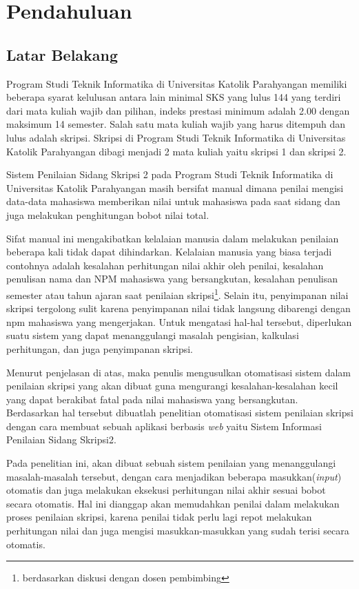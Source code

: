 \chapter{Pendahuluan}
\label{chap:pendahuluan}

\section{Latar Belakang}
\label{sec:latarBelakang}

	Program Studi Teknik Informatika di Universitas Katolik Parahyangan memiliki beberapa syarat kelulusan antara lain minimal SKS yang lulus 144 yang terdiri dari mata kuliah wajib dan pilihan, indeks prestasi minimum adalah 2.00 dengan maksimum 14 semester. Salah satu mata kuliah wajib yang harus ditempuh dan lulus adalah skripsi. Skripsi di Program Studi Teknik Informatika di Universitas Katolik Parahyangan dibagi menjadi 2 mata kuliah yaitu skripsi 1 dan skripsi 2. 
	
	Sistem Penilaian Sidang Skripsi 2 pada Program Studi Teknik Informatika di Universitas Katolik Parahyangan masih bersifat manual dimana penilai mengisi data-data mahasiswa  memberikan nilai untuk mahasiswa pada saat sidang dan juga melakukan penghitungan bobot nilai total. 
	
	Sifat manual ini mengakibatkan kelalaian manusia dalam melakukan penilaian beberapa kali tidak dapat dihindarkan. Kelalaian manusia yang biasa terjadi contohnya adalah kesalahan perhitungan nilai akhir oleh penilai, kesalahan penulisan nama dan NPM mahasiswa yang bersangkutan, kesalahan penulisan semester atau tahun ajaran saat penilaian skripsi\footnote{berdasarkan diskusi dengan dosen pembimbing}. Selain itu, penyimpanan nilai skripsi tergolong sulit karena penyimpanan nilai tidak langsung dibarengi dengan npm mahasiswa yang mengerjakan. Untuk mengatasi hal-hal tersebut, diperlukan suatu sistem yang dapat menanggulangi masalah pengisian, kalkulasi perhitungan, dan juga penyimpanan skripsi.
	
	Menurut penjelasan di atas, maka penulis mengusulkan otomatisasi sistem dalam penilaian skripsi yang akan dibuat guna mengurangi kesalahan-kesalahan kecil yang dapat berakibat fatal pada nilai mahasiswa yang bersangkutan. Berdasarkan hal tersebut dibuatlah penelitian otomatisasi sistem penilaian skripsi dengan cara membuat sebuah aplikasi berbasis \textit{web} yaitu Sistem Informasi Penilaian Sidang Skripsi2.
		
	Pada penelitian ini, akan dibuat sebuah sistem penilaian yang menanggulangi masalah-masalah tersebut, dengan cara menjadikan beberapa masukkan(\textit{input}) otomatis dan juga melakukan eksekusi perhitungan nilai akhir sesuai bobot secara otomatis. Hal ini dianggap akan memudahkan penilai dalam melakukan proses penilaian skripsi, karena penilai tidak perlu lagi repot melakukan perhitungan nilai dan juga mengisi masukkan-masukkan yang sudah terisi secara otomatis.
	
